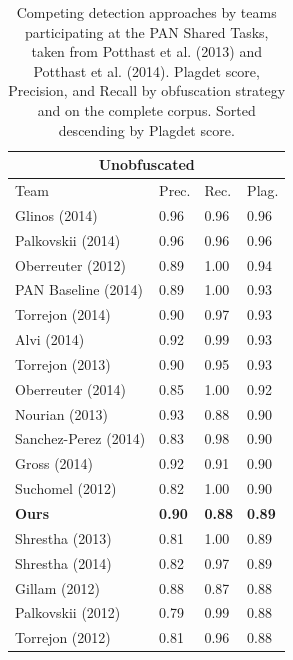 \begin{table}[th]

\scriptsize
\setlength{\tabcolsep}{4pt}%

\caption{Competing detection approaches by teams participating at the PAN Shared Tasks, taken from Potthast et al. (2013)\cite{potthast:2013} and Potthast et al. (2014)\cite{potthast:2014}. Plagdet score, Precision, and Recall by obfuscation strategy and on the complete corpus. Sorted descending by Plagdet score.}
\label{tab:pan13}

\begin{tabularx}{.31\textwidth}{@{}l*{3}{X}}
\multicolumn{4}{c}{\bfseries Unobfuscated} \\
\toprule
Team                & Prec.     & Rec.   & Plag.   \\
\midrule
Glinos (2014)       &         0.96 &   0.96 &    0.96 \\
Palkovskii (2014)   &         0.96 &   0.96 &    0.96 \\
Oberreuter (2012)   &         0.89 &   1.00 &    0.94 \\
PAN Baseline (2014) &         0.89 &   1.00 &    0.93 \\
Torrejon (2014)     &         0.90 &   0.97 &    0.93 \\
Alvi (2014)         &         0.92 &   0.99 &    0.93 \\
Torrejon (2013)     &         0.90 &   0.95 &    0.93 \\
Oberreuter (2014)   &         0.85 &   1.00 &    0.92 \\
Nourian (2013)      &         0.93 &   0.88 &    0.90 \\
Sanchez-Perez (2014)&         0.83 &   0.98 &    0.90 \\
Gross (2014)        &         0.92 &   0.91 &    0.90 \\
Suchomel (2012)     &         0.82 &   1.00 &    0.90 \\
\textbf{Ours}       &         \textbf{0.90} &  \textbf{0.88} &    \textbf{0.89} \\
Shrestha (2013)     &         0.81 &   1.00 &    0.89 \\
Shrestha (2014)     &         0.82 &   0.97 &    0.89 \\
Gillam (2012)       &         0.88 &   0.87 &    0.88 \\
Palkovskii (2012)   &         0.79 &   0.99 &    0.88 \\
Torrejon (2012)     &         0.81 &   0.96 &    0.88 \\

\end{tabularx}
\end{table}
